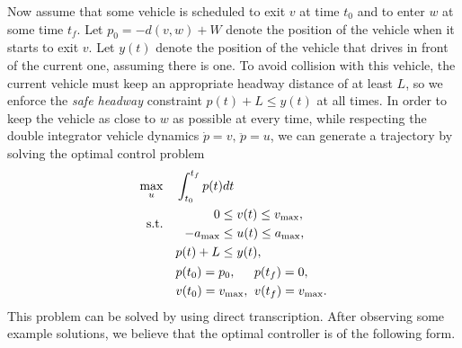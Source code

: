 \documentclass[a4paper]{article}
\theoremstyle{definition}
\theoremstyle{plain}
\begin{document}
Now assume that some vehicle is scheduled to exit $v$ at time $t_{0}$ and to
enter $w$ at some time $t_{f}$. Let $p_{0} = -d(v,w) + W$ denote the position of
the vehicle when it starts to exit $v$. Let $y(t)$ denote the position of the
vehicle that drives in front of the current one, assuming there is one. To avoid
collision with this vehicle, the current vehicle must keep an appropriate
headway distance of at least $L$, so we enforce the \textit{safe headway}
constraint $p(t) + L \leq y(t)$ at all times.
%
In order to keep the vehicle as close to $w$ as possible at every time, while
respecting the double integrator vehicle dynamics
$\dot{p} = v, \, \ddot{p} = u$, we can generate a trajectory by solving the
optimal control problem
\begin{equation}
  \label{eq:optimal_control}
  \begin{aligned}
  \max_{u}    \quad & \int_{t_{0}}^{t_{f}} p(t) dt \\
  \begin{alignedat}{2}\text{s.t.}\\ {}\end{alignedat} \quad &\begin{alignedat}{2}
                     0 \leq \; &v(t) \leq v_{\max} , \\
                     {-a_{\max}} \leq \; &u(t) \leq a_{\max} , \\
                    p(t) + L \leq \; & y(t) , \\
                    \end{alignedat} \\
                    &\begin{alignedat}[t]{2}
                    & p(t_{0}) = p_{0} , &&  p(t_{f}) = 0 , \\
                    & v(t_{0}) = v_{\max} , \;\; && v(t_{f}) = v_{\max} .
                    \end{alignedat}
  \end{aligned}
\end{equation}
%
This problem can be solved by using direct transcription. After observing some
example solutions, we believe that the optimal controller is of the following
form.
\end{document}
